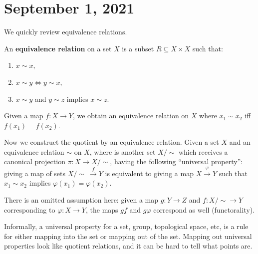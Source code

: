 \section{September 1, 2021} 
We quickly review equivalence relations.
\begin{definition}[]
    An \textbf{equivalence relation} on a set $X$ is a subset $R \subseteq X \times X$ such that:
    \begin{enumerate}[label=(\arabic*)]
    \setlength\itemsep{-.2em}
        \item $x\sim x$,
        \item $x\sim y \iff y \sim x$,
        \item $x\sim y$ and $y\sim z$ implies $x\sim z$.
    \end{enumerate}
\end{definition}
\begin{example}
    Given a map $f \colon X \to Y$, we obtain an equivalence relation on $X$ where $x_1\sim x_2$ iff $f(x_1)=f(x_2)$.
\end{example}
Now we construct the quotient by an equivalence relation. Given a set $X$ and an equivalence relation $\sim$ on $X$, where is another set $X / \sim$ which receives a canonical projection $\pi \colon X \to X / \sim$, having the following ``universal property'': giving a map of sets $X / \sim \ \xrightarrow{f} Y$ is equivalent to giving a map $X \xrightarrow{\varphi } Y$ such that $x_1\sim x_2$ implies $\varphi (x_1)=\varphi (x_2)$.

    There is an omitted assumption here: given a map $g \colon Y \to Z$ and $f \colon X / \sim \to Y$ corresponding to $\varphi  \colon X \to Y$, the maps $gf$ and $g \varphi $ correspond as well (functorality).
\begin{remark}
    Informally, a universal property for a set, group, topological space, etc, is a rule for either mapping into the set or mapping out of the set. Mapping out universal properties look like quotient relations, and it can be hard to tell what points are.

\end{remark}


